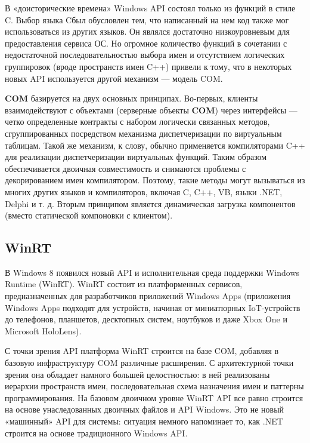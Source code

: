 \documentclass[14pt, a4paper]{article}
\begin{document}
В «доисторические времена» Windows API состоял только из функций в стиле C. Выбор языка Cбыл обусловлен тем,
что написанный на нем код также мог использоваться из других языков. Он являлся достаточно низкоуровневым
для предоставления сервиса ОС. Но огромное количество функций в сочетании с недостаточной последовательностью
выбора имен и отсутствием логических группировок (вроде пространств имен C++) привели к тому,
что в некоторых новых API используется другой механизм — модель COM.


\textbf{COM} базируется на двух основных принципах. Во-первых, клиенты взаимодействуют с объектами
(серверные объекты \textbf{COM}) через интерфейсы — четко определенные контракты с набором логически связанных методов,
сгруппированных посредством механизма диспетчеризации по виртуальным таблицам. Такой же механизм, к слову,
обычно применяется компиляторами C++ для реализации диспетчеризации виртуальных функций.
Таким образом обеспечивается двоичная совместимость и снимаются проблемы с декорированием имен компилятором.
Поэтому, такие методы могут вызываться из многих других языков и компиляторов, включая C, C++, VB, языки .NET,
Delphi и т. д. Вторым принципом является динамическая загрузка компонентов (вместо статической компоновки с клиентом).\\


\begin{centering}
    \subsection*{WinRT}
\end{centering}

В Windows 8 появился новый API и исполнительная среда поддержки Windows Runtime (WinRT).
WinRT состоит из платформенных сервисов, предназначенных для разработчиков приложений Windows Apps
(приложения Windows Apps подходят для устройств, начиная от миниатюрных IoT-устройств до телефонов,
планшетов, десктопных систем, ноутбуков и даже Xbox One и Microsoft HoloLens).


С точки зрения API платформа WinRT строится на базе COM, добавляя в базовую инфраструктуру
COM различные расширения. С архитектурной точки зрения она обладает намного большей целостностью:
в ней реализованы иерархии пространств имен, последовательная схема назначения имен и паттерны программирования.
На базовом двоичном уровне WinRT API все равно строится на основе унаследованных двоичных файлов и API Windows.
Это не новый «машинный» API для системы: ситуация немного напоминает то, как .NET строится на основе
традиционного Windows API.\\
\end{document}
